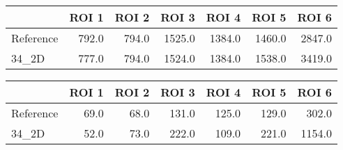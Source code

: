 \begin{tabular}{lrrrrrr}
\toprule
{} &  ROI 1 &  ROI 2 &   ROI 3 &   ROI 4 &   ROI 5 &   ROI 6 \\
\midrule
Reference &  792.0 &  794.0 &  1525.0 &  1384.0 &  1460.0 &  2847.0 \\
34\_2D     &  777.0 &  794.0 &  1524.0 &  1384.0 &  1538.0 &  3419.0 \\
\bottomrule
\end{tabular}
\begin{tabular}{lrrrrrr}
\toprule
{} &  ROI 1 &  ROI 2 &  ROI 3 &  ROI 4 &  ROI 5 &   ROI 6 \\
\midrule
Reference &   69.0 &   68.0 &  131.0 &  125.0 &  129.0 &   302.0 \\
34\_2D     &   52.0 &   73.0 &  222.0 &  109.0 &  221.0 &  1154.0 \\
\bottomrule
\end{tabular}
